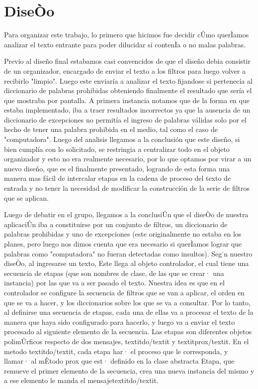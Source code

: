 \section{DiseÒo}

Para organizar este trabajo, lo primero que hicimos fue decidir cÛmo querÌamos analizar el texto entrante para poder dilucidar si contenÌa o no malas palabras. 

Previo al diseño final estabamos casi convencidos de que el diseño debia consistir de un organizador, encargado de enviar el texto a los filtros para luego volver a recibirlo "limpio". Luego este enviaría a analizar el texto fijandose si pertenecía al diccionario de palabras prohibidas obteniendo finalmente el resultado que sería el que mostraba por pantalla.
A primera instancia notamos que de la forma en que estaba implementado, iba a traer resultados incorrectos ya que la ausencia de un diccionario de excepciones no permitía el ingreso de palabras válidas solo por el hecho de tener una palabra prohibida en el medio, tal como el caso de "computadora". Luego del analisis llegamos a la conclusión que este diseño, si bien cumplía con lo solicitado, se restringia a centralizar todo en el objeto organizador y esto no era realmente necesario, por lo que optamos por virar a un nuevo diseño, que es el finalmente presentado, logrando de esta forma una manera mas fácil de intercalar etapas en la cadena de proceso del texto de entrada y no tener la necesidad de modificar la construcción de la serie de filtros que se aplican.

Luego de debatir en el grupo, llegamos a la conclusiÛn que el diseÒo de nuestra aplicaciÛn iba a constituirse por un conjunto de filtros, un diccionario de palabras prohibidas y uno de excepciones (este originalmente no estaba en los planes, pero luego nos dimos cuenta que era necesario si querÌamos lograr que palabras como "computadora" no fueran detectadas como insultos).
Seg˙n nuestro diseÒo, al ingresarse un texto, Este llega al objeto controlador, el cual tiene una secuencia de etapas (que son nombres de clase, de las que se crear· una instancia) por las que va a ser pasado el texto. Nuestra idea es que en el controlador se configure la secuencia de filtros que se van a aplicar, el orden en que se va a hacer, y los diccionarios sobre los que se va a consultar. Por lo tanto, al definirse una secuencia de etapas, cada una de ellas va a procesar el texto de la manera que haya sido configurado para hacerlo, y luego va a enviar el texto procesado al siguiente elemento de la secuencia. Las etapas son diferentes objetos polimÛrficos respecto de dos mensajes, {textit}do{/textit} y {textit}prox{/textit}. En el metodo {textit}do{/textit}, cada etapa har· el proceso que le corresponda, y llamar· al mÈtodo prox que est· definido en la clase abstracta Etapa, que remueve el primer elemento de la secuencia, crea una nueva instancia del mismo y a ese elemento le manda el mensaje{textit}do{/textit}.

